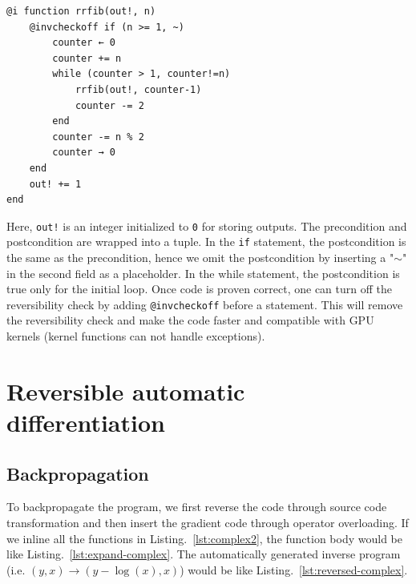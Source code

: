 \documentclass{article}
\newcommand{\<}{\langle}
\renewcommand{\>}{\rangle}
\newcommand{\Lst}[1]{Listing.~\ref{#1}}
\theoremstyle{definition}\newtheorem{definition}{\textit{Definition}}
\begin{document}
\begin{minipage}{.88\columnwidth}
\begin{lstlisting}[mathescape=true,caption={Computing Fibonacci number recursively and reversibly.},label={lst:fib}]
@i function rrfib(out!, n)
    @invcheckoff if (n >= 1, ~)
        counter ← 0
        counter += n
        while (counter > 1, counter!=n)
            rrfib(out!, counter-1)
            counter -= 2
        end
        counter -= n % 2
        counter → 0
    end
    out! += 1
end
\end{lstlisting}
\end{minipage}

Here, \texttt{out!} is an integer initialized to \texttt{0} for storing outputs.
The precondition and postcondition are wrapped into a tuple. In the \texttt{if} statement, the postcondition is the same as the precondition, hence we omit the postcondition by inserting a "\texttt{$\sim$}" in the second field as a placeholder.
In the while statement, the postcondition is true only for the initial loop.
Once code is proven correct, one can turn off the reversibility check by adding \texttt{@invcheckoff} before a statement.
This will remove the reversibility check and make the code faster and compatible with GPU kernels (kernel functions can not handle exceptions).

\section{Reversible automatic differentiation}\label{sec:bp}

\subsection{Backpropagation}\label{sec:jacobian}
To backpropagate the program, we first reverse the code through source code transformation and then insert the gradient code through operator overloading.
If we inline all the functions in \Lst{lst:complex2}, the function body would be like \Lst{lst:expand-complex}.
The automatically generated inverse program (i.e. $(y, x) \rightarrow (y-\log(x), x)$) would be like \Lst{lst:reversed-complex}.
\end{document}
